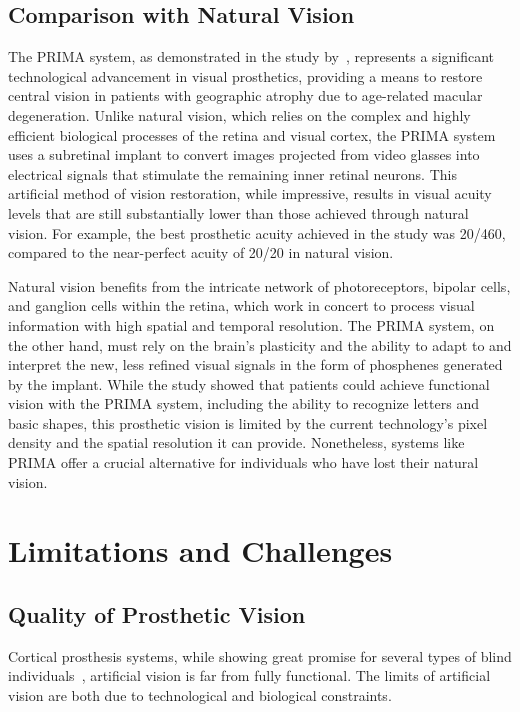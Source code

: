 \documentclass[twocolumn,10pt]{article}
\begin{document}
\subsection*{Comparison with Natural Vision}
The PRIMA system, as demonstrated in the study
by~\textcite{palankerSimultaneousPerceptionProsthetic2022}, represents a
significant technological advancement in visual prosthetics, providing a means
to restore central vision in patients with geographic atrophy due to age-related
macular degeneration. Unlike natural vision, which relies on the complex and
highly efficient biological processes of the retina and visual cortex, the PRIMA
system uses a subretinal implant to convert images projected from video glasses
into electrical signals that stimulate the remaining inner retinal neurons. This
artificial method of vision restoration, while impressive, results in visual
acuity levels that are still substantially lower than those achieved through
natural vision. For example, the best prosthetic acuity achieved in the study
was 20/460, compared to the near-perfect acuity of 20/20 in natural vision.

Natural vision benefits from the intricate network of photoreceptors, bipolar
cells, and ganglion cells within the retina, which work in concert to process
visual information with high spatial and temporal resolution. The PRIMA system,
on the other hand, must rely on the brain's plasticity and the ability to adapt
to and interpret the new, less refined visual signals in the form of phosphenes
generated by the implant. While the study showed that patients could achieve
functional vision with the PRIMA system, including the ability to recognize
letters and basic shapes, this prosthetic vision is limited by the current
technology's pixel density and the spatial resolution it can provide.
Nonetheless, systems like PRIMA offer a crucial alternative for individuals who
have lost their natural vision.

\section*{Limitations and Challenges}\label{sec:limitations}
\subsection*{Quality of Prosthetic Vision}
Cortical prosthesis systems, while showing great promise for several types of
blind
individuals~\parencite{deruytervansteveninckRealworldIndoorMobility2022,deruytervansteveninckEndtoendOptimizationProsthetic2022,kucukogluOptimizationNeuroprostheticVision2022},
artificial vision is far from fully functional. The limits of artificial vision
are both due to technological and biological constraints.
\end{document}
